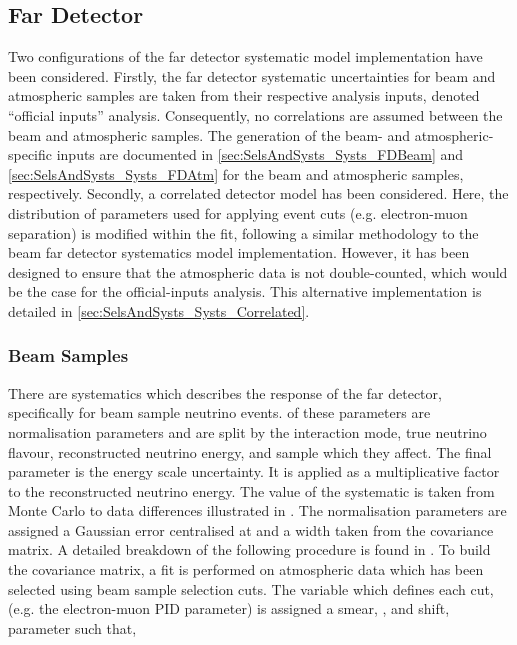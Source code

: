 \subsection{Far Detector}
\label{sec:SelsAndSysts_Systs_FD}

Two configurations of the far detector systematic model implementation have been considered. Firstly, the far detector systematic uncertainties for beam and atmospheric samples are taken from their respective analysis inputs, denoted ``official inputs'' analysis. Consequently, no correlations are assumed between the beam and atmospheric samples. The generation of the beam- and atmospheric-specific inputs are documented in \autoref{sec:SelsAndSysts_Systs_FDBeam} and \autoref{sec:SelsAndSysts_Systs_FDAtm} for the beam and atmospheric samples, respectively. Secondly, a correlated detector model has been considered. Here, the distribution of parameters used for applying event cuts (e.g. electron-muon separation) is modified within the fit, following a similar methodology to the beam far detector systematics model implementation. However, it has been designed to ensure that the atmospheric data is not double-counted, which would be the case for the official-inputs analysis. This alternative implementation is detailed in \autoref{sec:SelsAndSysts_Systs_Correlated}.

\subsubsection{Beam Samples}
\label{sec:SelsAndSysts_Systs_FDBeam}

There are  systematics which describes the response of the far detector, specifically for beam sample neutrino events.  of these parameters are normalisation parameters and are split by the interaction mode, true neutrino flavour, reconstructed neutrino energy, and sample which they affect. The final parameter is the energy scale uncertainty. It is applied as a multiplicative factor to the reconstructed neutrino energy. The value of the systematic is taken from Monte Carlo to data differences illustrated in \cite{sk_2017}. The normalisation parameters are assigned a Gaussian error centralised at  and a width taken from the covariance matrix. A detailed breakdown of the following procedure is found in \cite{t2k_tn_318}. To build the covariance matrix,  a fit is performed on atmospheric data which has been selected using beam sample selection cuts. The variable which defines each cut,  (e.g. the electron-muon PID parameter) is assigned a smear, \quickmath{\alpha}, and shift, \quickmath{\beta} parameter such that,

